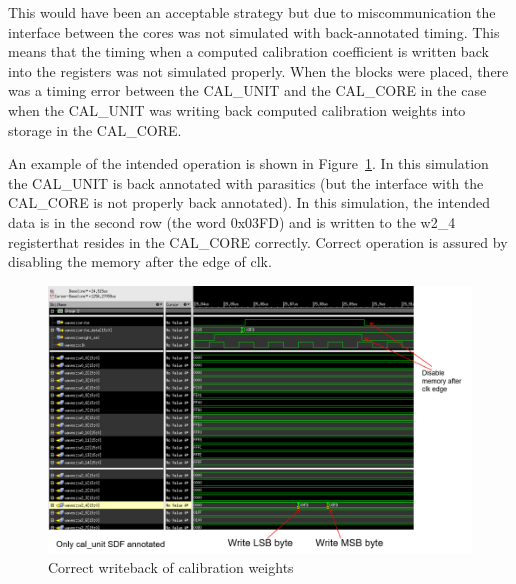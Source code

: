 This would have been an acceptable strategy but due to miscommunication the interface between the cores was not simulated with back-annotated timing. This means that the timing when a computed calibration coefficient is written back into the registers was not simulated properly. When the blocks were placed, there was a timing error between the CAL\_UNIT and the CAL\_CORE in the case when the CAL\_UNIT was writing back computed calibration weights into storage in the CAL\_CORE.

An example of the intended operation is shown in Figure~\ref{fig:correctcalwrite}. In this simulation the CAL\_UNIT is back annotated with parasitics (but the interface with the CAL\_CORE is not properly back annotated). In this simulation, the intended data is in the second row (the word 0x03FD) and is written to the w2\_4 registerthat resides in the CAL\_CORE correctly. Correct operation is assured by disabling the memory after the edge of clk.
\begin{figure}[h]
\centering
\begin{center}
\includegraphics[width=1.0\textwidth]{figures/CorrectCalWrite.png}
\end{center}
\caption{Correct writeback of calibration weights}
\label{fig:correctcalwrite}
\end{figure}


